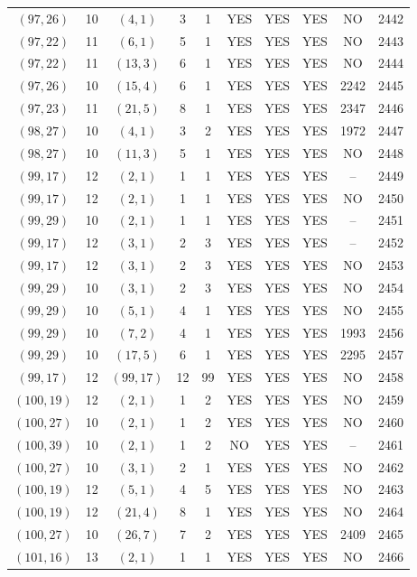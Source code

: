 \begin{longtable}{|c|c|c|c|c|c|c|c|c|c|}
$(97, 26)$ & 10 & $(4, 1)$ & 3 & 1 & YES & YES & YES & NO & 2442\\
$(97, 22)$ & 11 & $(6, 1)$ & 5 & 1 & YES & YES & YES & NO & 2443\\
$(97, 22)$ & 11 & $(13, 3)$ & 6 & 1 & YES & YES & YES & NO & 2444\\
$(97, 26)$ & 10 & $(15, 4)$ & 6 & 1 & YES & YES & YES & 2242 & 2445\\
$(97, 23)$ & 11 & $(21, 5)$ & 8 & 1 & YES & YES & YES & 2347 & 2446\\
$(98, 27)$ & 10 & $(4, 1)$ & 3 & 2 & YES & YES & YES & 1972 & 2447\\
$(98, 27)$ & 10 & $(11, 3)$ & 5 & 1 & YES & YES & YES & NO & 2448\\
$(99, 17)$ & 12 & $(2, 1)$ & 1 & 1 & YES & YES & YES & -- & 2449\\
$(99, 17)$ & 12 & $(2, 1)$ & 1 & 1 & YES & YES & YES & NO & 2450\\
$(99, 29)$ & 10 & $(2, 1)$ & 1 & 1 & YES & YES & YES & -- & 2451\\
$(99, 17)$ & 12 & $(3, 1)$ & 2 & 3 & YES & YES & YES & -- & 2452\\
$(99, 17)$ & 12 & $(3, 1)$ & 2 & 3 & YES & YES & YES & NO & 2453\\
$(99, 29)$ & 10 & $(3, 1)$ & 2 & 3 & YES & YES & YES & NO & 2454\\
$(99, 29)$ & 10 & $(5, 1)$ & 4 & 1 & YES & YES & YES & NO & 2455\\
$(99, 29)$ & 10 & $(7, 2)$ & 4 & 1 & YES & YES & YES & 1993 & 2456\\
$(99, 29)$ & 10 & $(17, 5)$ & 6 & 1 & YES & YES & YES & 2295 & 2457\\
$(99, 17)$ & 12 & $(99, 17)$ & 12 & 99 & YES & YES & YES & NO & 2458\\
$(100, 19)$ & 12 & $(2, 1)$ & 1 & 2 & YES & YES & YES & NO & 2459\\
$(100, 27)$ & 10 & $(2, 1)$ & 1 & 2 & YES & YES & YES & NO & 2460\\
$(100, 39)$ & 10 & $(2, 1)$ & 1 & 2 & NO & YES & YES & -- & 2461\\
$(100, 27)$ & 10 & $(3, 1)$ & 2 & 1 & YES & YES & YES & NO & 2462\\
$(100, 19)$ & 12 & $(5, 1)$ & 4 & 5 & YES & YES & YES & NO & 2463\\
$(100, 19)$ & 12 & $(21, 4)$ & 8 & 1 & YES & YES & YES & NO & 2464\\
$(100, 27)$ & 10 & $(26, 7)$ & 7 & 2 & YES & YES & YES & 2409 & 2465\\
$(101, 16)$ & 13 & $(2, 1)$ & 1 & 1 & YES & YES & YES & NO & 2466\\

\end{longtable}
